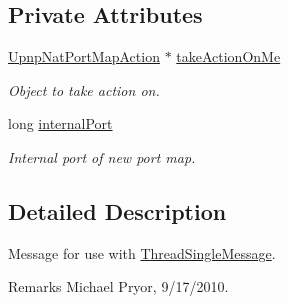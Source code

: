 \subsection*{Private Attributes}
\begin{DoxyCompactItemize}
\item 
\hypertarget{class_thread_message_item_set_port_map_internal_port_a747a4267268de72c2478e81002f350da}{
\hyperlink{class_upnp_nat_port_map_action}{UpnpNatPortMapAction} $\ast$ \hyperlink{class_thread_message_item_set_port_map_internal_port_a747a4267268de72c2478e81002f350da}{takeActionOnMe}}
\label{class_thread_message_item_set_port_map_internal_port_a747a4267268de72c2478e81002f350da}

\begin{DoxyCompactList}\small\item\em Object to take action on. \item\end{DoxyCompactList}\item 
\hypertarget{class_thread_message_item_set_port_map_internal_port_a1352fdf567a3b527c0902b2866034aa6}{
long \hyperlink{class_thread_message_item_set_port_map_internal_port_a1352fdf567a3b527c0902b2866034aa6}{internalPort}}
\label{class_thread_message_item_set_port_map_internal_port_a1352fdf567a3b527c0902b2866034aa6}

\begin{DoxyCompactList}\small\item\em Internal port of new port map. \item\end{DoxyCompactList}\end{DoxyCompactItemize}


\subsection{Detailed Description}
Message for use with \hyperlink{class_thread_single_message}{ThreadSingleMessage}. \begin{DoxyRemark}{Remarks}
Michael Pryor, 9/17/2010. 
\end{DoxyRemark}


